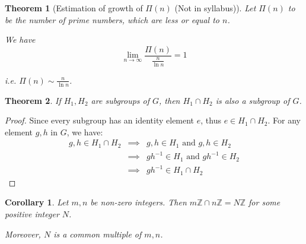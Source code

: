 \documentclass{article}
\theoremstyle{MyNonumberplain}
\theoremstyle{break}
\newtheorem*{proof}{Proof. }
\newcommand{\Z}{\mathbb{Z}}
\newcommand{\infixand}{\text{ and }}
\theoremstyle{break}
\newtheorem{theorem}{Theorem}[section]
\newtheorem{corollary}{Corollary}[theorem]
\theoremstyle{break}
\theoremstyle{definition}
\theoremstyle{break}
\begin{document}
\begin{thmbox}
    \begin{theorem}[Estimation of growth of $\Pi(n)$ (Not in syllabus)]
        Let $\Pi (n)$ to be the number of prime numbers, which are less or equal to $n$.\bigskip
        
        We have
        \[ \lim_{n \rightarrow \infty} \frac{\Pi (n)}{\frac{n}{\ln n}} = 1 \]

        i.e. $\Pi (n) \sim \frac{n}{\ln n}$.
    \end{theorem}
\end{thmbox}

\begin{thmbox}
    \begin{theorem}
        If $H_1,H_2$ are subgroups of $G$, then $H_1\cap H_2$ is also a subgroup of $G$. 
    \end{theorem}
    \begin{prfbox}
        \begin{proof}
            Since every subgroup has an identity element $e$, thus $e\in H_1\cap H_2$.\bigskip
            For any element $g,h$ in $G$, we have:
            \begin{eqnarray*}
                g,h\in H_1\cap H_2 & \implies & g,h\in H_1 \infixand g,h\in H_2 \\ 
                                   & \implies & gh^{-1}\in H_1 \infixand gh^{-1}\in H_2\\
                                   & \implies & gh^{-1}\in H_1\cap H_2
            \end{eqnarray*}
        \end{proof}
    \end{prfbox}
\end{thmbox}

\begin{thmbox}
    \begin{corollary}
        Let $m,n$ be non-zero integers. Then $m\Z\cap n\Z=N\Z$ for some positive integer $N$.\bigskip

        Moreover, $N$ is a common multiple of $m,n$.
    \end{corollary}    
\end{thmbox}
\end{document}
